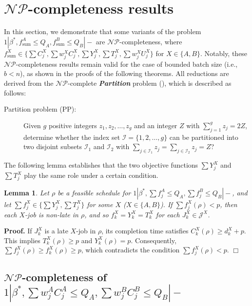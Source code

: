 \documentclass[12pt]{article}
\newtheorem{lemma}{Lemma}[section]
\begin{document}
\begin{sloppypar}
\section{$\mathcal{NP}$-completeness results}

In this section, we demonstrate that some variants of the problem $1 | \beta^{*}, f_{\mathrm{sum}}^A \leq Q_A, f_{\mathrm{sum}}^B \leq Q_B|-$ are $\mathcal{NP}$-completeness, where $f_{\mathrm{sum}}^X \in \{\sum C_j^X, \sum w_j^X C_j^X, \sum Y_j^X, \sum T_j^X, \sum w_j^X U_j^X\}$ for $X \in \{A, B\}$. Notably, these $\mathcal{NP}$-completeness results remain valid for the case of bounded batch size (i.e., $b < n$), as shown in the proofs of the following theorems. All reductions are derived from the $\mathcal{NP}$-complete \textbf{\emph{Partition}} problem (\citealp{Garey1979computer}), which is described as follows:

\begin{description}
\item[Partition problem (PP):] Given $g$ positive integers $z_1, z_2, \ldots, z_g$ and an integer $Z$ with $\sum_{j=1}^g z_j=2 Z$, determine whether the index set $\mathcal{I}=\{1, 2, \ldots, g\}$ can be partitioned into two disjoint subsets $\mathcal{I}_1$ and $\mathcal{I}_2$ with $\sum_{j \in \mathcal{I}_1} z_j=\sum_{j \in \mathcal{I}_2} z_j=Z$? 
\end{description}

The following lemma establishes that the two objective functions $\sum Y_j^X$ and $\sum T_j^X$ play the same role under a certain condition.

\begin{lemma} \label{L-4.1}
Let $\rho$ be a feasible schedule for $1 | \beta^{*}, \sum f_j^A \leq Q_A, \sum f_j^B \leq Q_B|-$, and let $\sum f_j^X \in \{\sum Y_j^X, \sum T_j^X\}$ for some $X$ ($X \in \{A, B\}$). If $\sum f_j^X(\rho) < p$, then each $X$-job is non-late in $\rho$, and so $f_k^X=Y_k^X=T_k^X$ for each $J_k^X \in \mathcal{J}^X$.
\end{lemma}

\noindent \textbf{Proof.} If $J_k^X$ is a late $X$-job in $\rho$, its completion time satisfies $C_k^X(\rho) \geq d_k^X+p$. This implies $T_k^X(\rho) \geq p$ and $Y_k^X(\rho)=p$. Consequently, $\sum f_j^X(\rho) \geq f_k^X(\rho) \geq p$, which contradicts the condition $\sum f_j^X(\rho) < p$. \hfill$\Box$

\subsection{$\mathcal{NP}$-completeness of $1 | \beta^{*}, \sum w_j^A C_j^A \leq Q_A, \sum w_j^B C_j^B \leq Q_B|-$} 


\end{sloppypar}
\end{document}
